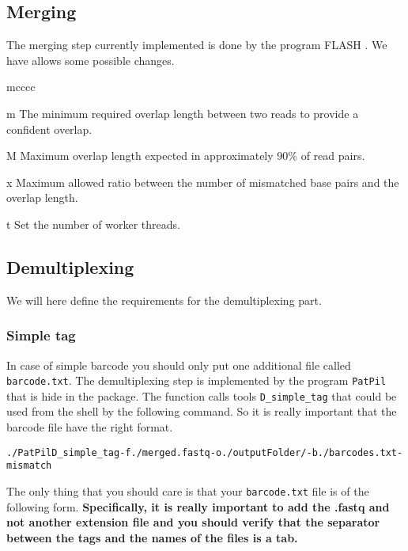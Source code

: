 \documentclass{article}\usepackage[]{graphicx}\usepackage[]{color}
\makeatletter
\newenvironment{kframe}{%
 \def\at@end@of@kframe{}%
 \ifinner\ifhmode%
  \def\at@end@of@kframe{\end{minipage}}%
  \begin{minipage}{\columnwidth}%
 \fi\fi%
 \def\FrameCommand##1{\hskip\@totalleftmargin \hskip-\fboxsep
 \colorbox{shadecolor}{##1}\hskip-\fboxsep
     \hskip-\linewidth \hskip-\@totalleftmargin \hskip\columnwidth}%
 \MakeFramed {\advance\hsize-\width
   \@totalleftmargin\z@ \linewidth\hsize
   \@setminipage}}%
 {\par\unskip\endMakeFramed%
 \at@end@of@kframe}
\newenvironment{knitrout}{}{} %
\makeatother
\begin{document}
\subsection{Merging}
\label{subsec:merge}

The merging step currently implemented is done by the program FLASH \cite{Magoc2011}. We have allows some possible changes.

\begin{labeling}{mcccc}
\item [m] The minimum required overlap length between two reads to provide a confident overlap.
\item [M] Maximum overlap length expected in approximately 90\% of read pairs.
\item [x] Maximum allowed ratio between the number of mismatched base pairs and the overlap length.
\item [t] Set the number of worker threads.
\end{labeling}

\subsection{Demultiplexing}
\label{subsec:demux}
We will here define the requirements for the demultiplexing part.

\subsubsection{Simple tag}
 In case of simple barcode you should only put one additional file called \texttt{barcode.txt}. The demultiplexing step is implemented by the program \texttt{PatPil} that is hide in the package. The function calls tools \texttt{D\_simple\_tag} that could be used from the shell by the following command. So it is really important that the barcode file have the right format.

\begin{knitrout}\footnotesize
{}\color{fgcolor}\begin{kframe}
\begin{alltt}
./PatPil D_simple_tag -f ./merged.fastq -o ./outputFolder/ -b ./barcodes.txt -mismatch
\end{alltt}
\end{kframe}
\end{knitrout}

The only thing that you should care is that your \texttt{barcode.txt} file is of the following form. \textbf{Specifically, it is really important to add the .fastq and not another extension file and you should verify that the separator between the tags and the names of the files is a tab.}
\end{document}
